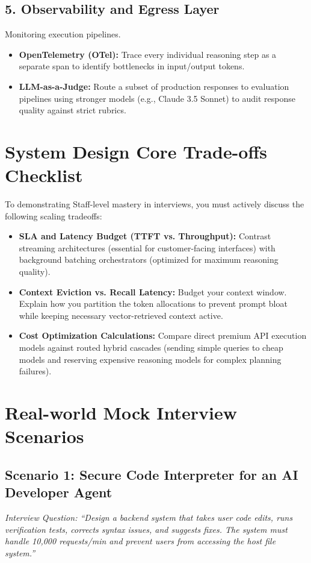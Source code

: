 \subsection{5. Observability and Egress Layer}
Monitoring execution pipelines.
\begin{itemize}
    \item \textbf{OpenTelemetry (OTel):} Trace every individual reasoning step as a separate span to identify bottlenecks in input/output tokens.
    \item \textbf{LLM-as-a-Judge:} Route a subset of production responses to evaluation pipelines using stronger models (e.g., Claude 3.5 Sonnet) to audit response quality against strict rubrics.
\end{itemize}

\section{System Design Core Trade-offs Checklist}

To demonstrating Staff-level mastery in interviews, you must actively discuss the following scaling tradeoffs:

\begin{itemize}
    \item \textbf{SLA and Latency Budget (TTFT vs. Throughput):} Contrast streaming architectures (essential for customer-facing interfaces) with background batching orchestrators (optimized for maximum reasoning quality).
    \item \textbf{Context Eviction vs. Recall Latency:} Budget your context window. Explain how you partition the token allocations to prevent prompt bloat while keeping necessary vector-retrieved context active.
    \item \textbf{Cost Optimization Calculations:} Compare direct premium API execution models against routed hybrid cascades (sending simple queries to cheap models and reserving expensive reasoning models for complex planning failures).
\end{itemize}

\section{Real-world Mock Interview Scenarios}

\subsection{Scenario 1: Secure Code Interpreter for an AI Developer Agent}
\textit{Interview Question: ``Design a backend system that takes user code edits, runs verification tests, corrects syntax issues, and suggests fixes. The system must handle 10,000 requests/min and prevent users from accessing the host file system.''}

